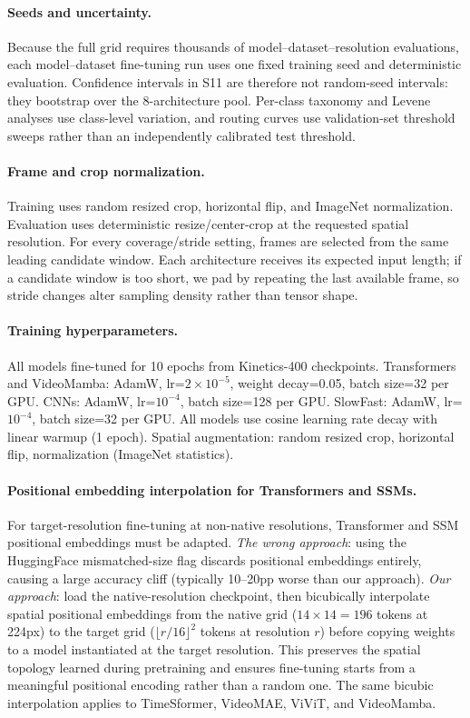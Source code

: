 \documentclass[runningheads]{llncs}
\begin{document}
\paragraph{Seeds and uncertainty.}
Because the full grid requires thousands of model--dataset--resolution evaluations, each model--dataset fine-tuning run uses one fixed training seed and deterministic evaluation. Confidence intervals in S11 are therefore not random-seed intervals: they bootstrap over the 8-architecture pool. Per-class taxonomy and Levene analyses use class-level variation, and routing curves use validation-set threshold sweeps rather than an independently calibrated test threshold.

\paragraph{Frame and crop normalization.}
Training uses random resized crop, horizontal flip, and ImageNet normalization. Evaluation uses deterministic resize/center-crop at the requested spatial resolution. For every coverage/stride setting, frames are selected from the same leading candidate window. Each architecture receives its expected input length; if a candidate window is too short, we pad by repeating the last available frame, so stride changes alter sampling density rather than tensor shape.

\paragraph{Training hyperparameters.}
All models fine-tuned for 10 epochs from Kinetics-400 checkpoints. Transformers and VideoMamba: AdamW, lr=$2\times10^{-5}$, weight decay=0.05, batch size=32 per GPU. CNNs: AdamW, lr=$10^{-4}$, batch size=128 per GPU. SlowFast: AdamW, lr=$10^{-4}$, batch size=32 per GPU. All models use cosine learning rate decay with linear warmup (1 epoch). Spatial augmentation: random resized crop, horizontal flip, normalization (ImageNet statistics).

\paragraph{Positional embedding interpolation for Transformers and SSMs.}
For target-resolution fine-tuning at non-native resolutions, Transformer and SSM positional embeddings must be adapted. \textit{The wrong approach}: using the HuggingFace mismatched-size flag discards positional embeddings entirely, causing a large accuracy cliff (typically 10--20pp worse than our approach). \textit{Our approach}: load the native-resolution checkpoint, then bicubically interpolate spatial positional embeddings from the native grid ($14{\times}14{=}196$ tokens at 224px) to the target grid ($\lfloor r/16\rfloor^2$ tokens at resolution $r$) before copying weights to a model instantiated at the target resolution. This preserves the spatial topology learned during pretraining and ensures fine-tuning starts from a meaningful positional encoding rather than a random one. The same bicubic interpolation applies to TimeSformer, VideoMAE, ViViT, and VideoMamba.
\end{document}
